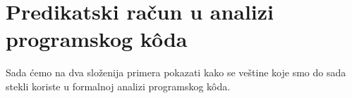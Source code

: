 


\section{Predikatski ra\v cun u analizi programskog k\^oda}

Sada \'cemo na dva slo\v zenija primera pokazati kako se ve\v stine koje smo do sada stekli koriste u formalnoj analizi programskog k\^oda.

